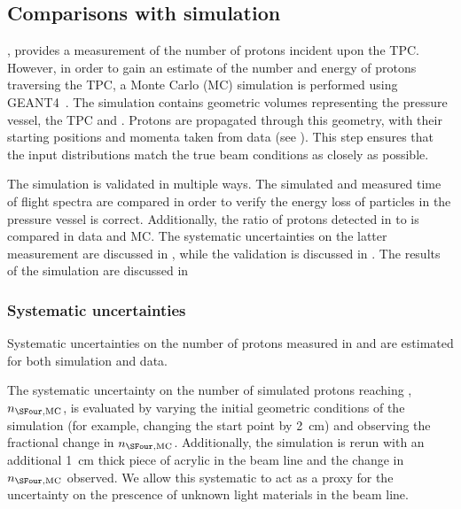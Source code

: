 \subsection{Comparisons with simulation}
\label{sec:hptpc_beam_flux:results:MCData}

, provides a measurement of the number of protons incident upon the TPC.
However, in order to gain an estimate of the number and energy of protons traversing the TPC, a Monte Carlo (MC) simulation is performed using GEANT4~\cite{geant}.
The simulation contains geometric volumes representing the pressure vessel, the TPC and \SFour.
Protons are propagated through this geometry, with their starting positions and momenta taken from \SThree data (see ).
This step ensures that the input distributions match the true beam conditions as closely as possible.

The simulation is validated in multiple ways.
The simulated and measured time of flight spectra are compared in order to verify the energy loss of particles in the pressure vessel is correct.
Additionally, the ratio of protons detected in \SThree to \SFour is compared in data and MC.
The systematic uncertainties on the latter measurement are discussed in , while the validation is discussed in .
The results of the simulation are discussed in 

\subsubsection{Systematic uncertainties}
\label{sec:hptpc_beam_flux:results:MCData:systs}

Systematic uncertainties on the number of protons measured in \SThree and \SFour are estimated for both simulation and data.

The systematic uncertainty on the number of simulated protons reaching \SFour, $n_{\SFour,\text{MC}}$, is evaluated by varying the initial geometric conditions of the simulation (for example, changing the \STwo start point by \SI{2}{\centi\metre}) and observing the fractional change in $n_{\SFour,\text{MC}}$.
Additionally, the simulation is rerun with an additional \SI{1}{\centi\metre} thick piece of acrylic in the beam line and the change in $n_{\SFour,\text{MC}}$ observed.
We allow this systematic to act as a proxy for the uncertainty on the prescence of unknown light materials in the beam line.


